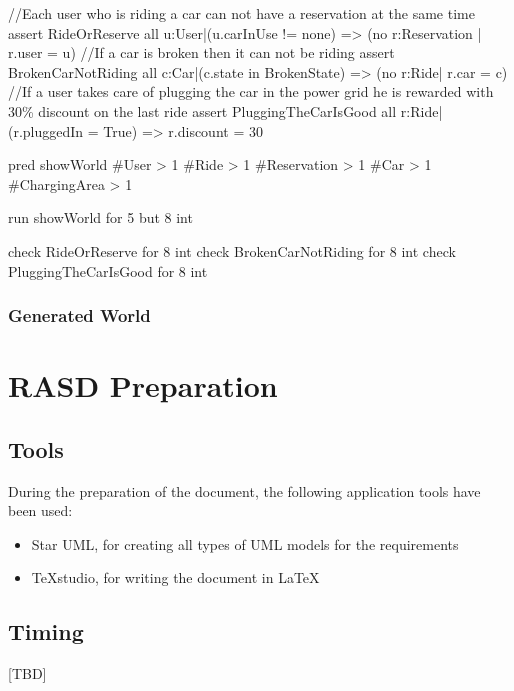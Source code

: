 \documentclass[11pt,a4paper]{report}
\begin{document}
\begin{alloyCode}
//Each user who is riding a car can not have a reservation at the same time
assert RideOrReserve{
	all u:User|(u.carInUse != none) => (no r:Reservation | r.user = u)
}
//If a car is broken then it can not be riding
assert BrokenCarNotRiding{
	all c:Car|(c.state in BrokenState) => (no r:Ride| r.car = c)
}
//If a user takes care of plugging the car in the power grid he is rewarded with 30\% discount on the last ride
assert PluggingTheCarIsGood{
	all r:Ride|(r.pluggedIn = True) => r.discount = 30
}

pred showWorld{
	#User > 1
	#Ride > 1 
	#Reservation > 1
	#Car > 1 
	#ChargingArea > 1
}

run showWorld for 5 but 8 int

check RideOrReserve for 8 int
check BrokenCarNotRiding for 8 int
check PluggingTheCarIsGood for 8 int
\end{alloyCode}
\vspace*{0.3cm} %
\subsection{Generated World}

\chapter{RASD Preparation}
\section{Tools}
During the preparation of the document, the following application tools have been used:
\begin{itemize}
	\item Star UML, for creating all types of UML models for the requirements
	\item TeXstudio, for writing the document in \LaTeX
\end{itemize}
\section{Timing}
[TBD]
%
\end{document}
